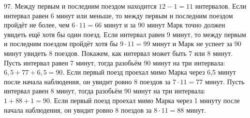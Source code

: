 97. Между первым и последним поездом находится $12-1=11$ интервалов. Если интервал равен 6 минут или меньше, то между первым и последним поездом пройдёт не более, чем $6\cdot11=66$ минут и за 90 минут Марк точно должен увидеть ещё хотя бы один поезд. Если интервал равен 9 минут, то между первым и последним поездом пройдёт хотя бы $9\cdot11=99$ минут и Марк не успеет за 90 минут увидеть 8 поездов. Покажем, как интервал может быть 7 или 8 минут. Пусть интервал равен 7 минут, тогда разобьём 90 минут на три интервала: $6,5+77+6,5=90.$ Если первый поезд проехал мимо Марка через 6,5 минут после начала наблюдения, он увидит ровно 8 поездов за $7\cdot11=77$ минут. Пусть интервал равен 8 минут, тогда разобьём 90 минут на три интервала: $1+88+1=90.$ Если первый поезд проехал мимо Марка через 1 минуту после начала наблюдения, он увидит ровно 8 поездов за $8\cdot11=88$ минут.\\
